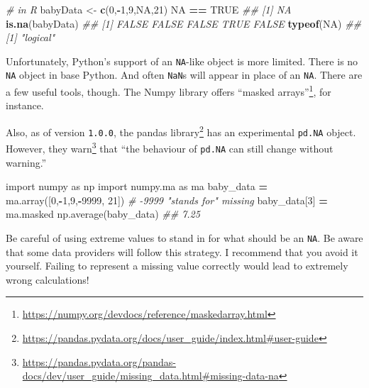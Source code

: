 \documentclass[12pt,krantz2]{krantz}
\makeatletter
\newenvironment{Shaded}{\begin{snugshade}}{\end{snugshade}}
\newcommand{\CommentTok}[1]{\textcolor[rgb]{0.37,0.37,0.37}{\textit{#1}}}
\newcommand{\DecValTok}[1]{\textcolor[rgb]{0.06,0.06,0.06}{#1}}
\newcommand{\ImportTok}[1]{#1}
\newcommand{\KeywordTok}[1]{\textcolor[rgb]{0.27,0.27,0.27}{\textbf{#1}}}
\newcommand{\NormalTok}[1]{#1}
\newcommand{\OperatorTok}[1]{\textcolor[rgb]{0.43,0.43,0.43}{\textbf{#1}}}
\newcommand{\OtherTok}[1]{\textcolor[rgb]{0.37,0.37,0.37}{#1}}
\newcommand{\StringTok}[1]{\textcolor[rgb]{0.5,0.5,0.5}{#1}}
\renewcommand{\href}[2]{#2\footnote{\url{#1}}}
\newenvironment{kframe}{%
\medskip{}
\setlength{\fboxsep}{.8em}
 \def\at@end@of@kframe{}%
 \ifinner\ifhmode%
  \def\at@end@of@kframe{\end{minipage}}%
  \begin{minipage}{\columnwidth}%
 \fi\fi%
 \def\FrameCommand##1{\hskip\@totalleftmargin \hskip-\fboxsep
 \colorbox{shadecolor}{##1}\hskip-\fboxsep
     \hskip-\linewidth \hskip-\@totalleftmargin \hskip\columnwidth}%
 \MakeFramed {\advance\hsize-\width
   \@totalleftmargin\z@ \linewidth\hsize
   \@setminipage}}%
 {\par\unskip\endMakeFramed%
 \at@end@of@kframe}
\renewenvironment{Shaded}{\begin{kframe}}{\end{kframe}}
\makeatother
\begin{document}
\begin{Shaded}
\begin{Highlighting}[]
\CommentTok{# in R}
\NormalTok{babyData <-}\StringTok{ }\KeywordTok{c}\NormalTok{(}\DecValTok{0}\NormalTok{,}\OperatorTok{-}\DecValTok{1}\NormalTok{,}\DecValTok{9}\NormalTok{,}\OtherTok{NA}\NormalTok{,}\DecValTok{21}\NormalTok{)}
\OtherTok{NA} \OperatorTok{==}\StringTok{ }\OtherTok{TRUE} 
\CommentTok{## [1] NA}
\KeywordTok{is.na}\NormalTok{(babyData)}
\CommentTok{## [1] FALSE FALSE FALSE  TRUE FALSE}
\KeywordTok{typeof}\NormalTok{(}\OtherTok{NA}\NormalTok{)}
\CommentTok{## [1] "logical"}
\end{Highlighting}
\end{Shaded}

Unfortunately, Python's support of an \texttt{NA}-like object is more limited. There is no \texttt{NA} object in base Python. And often \texttt{NaN}s will appear in place of an \texttt{NA}. There are a few useful tools, though. The Numpy library offers \href{https://numpy.org/devdocs/reference/maskedarray.html}{``masked arrays''}, for instance.

Also, as of version \texttt{1.0.0}, the \href{https://pandas.pydata.org/docs/user_guide/index.html\#user-guide}{pandas library} has an experimental \texttt{pd.NA} object. However, they \href{https://pandas.pydata.org/pandas-docs/dev/user_guide/missing_data.html\#missing-data-na}{warn} that ``the behaviour of \texttt{pd.NA} can still change without warning.''

\begin{Shaded}
\begin{Highlighting}[]
\ImportTok{import}\NormalTok{ numpy }\ImportTok{as}\NormalTok{ np}
\ImportTok{import}\NormalTok{ numpy.ma }\ImportTok{as}\NormalTok{ ma}
\NormalTok{baby_data }\OperatorTok{=}\NormalTok{ ma.array([}\DecValTok{0}\NormalTok{,}\OperatorTok{-}\DecValTok{1}\NormalTok{,}\DecValTok{9}\NormalTok{,}\OperatorTok{-}\DecValTok{9999}\NormalTok{, }\DecValTok{21}\NormalTok{]) }\CommentTok{# -9999 "stands for" missing}
\NormalTok{baby_data[}\DecValTok{3}\NormalTok{] }\OperatorTok{=}\NormalTok{ ma.masked}
\NormalTok{np.average(baby_data)}
\CommentTok{## 7.25}
\end{Highlighting}
\end{Shaded}

\begin{rmd-caution}
Be careful of using extreme values to stand in for what should be an \texttt{NA}. Be aware that some data providers will follow this strategy. I recommend that you avoid it yourself. Failing to represent a missing value correctly would lead to extremely wrong calculations!

\end{rmd-caution}
\end{document}
